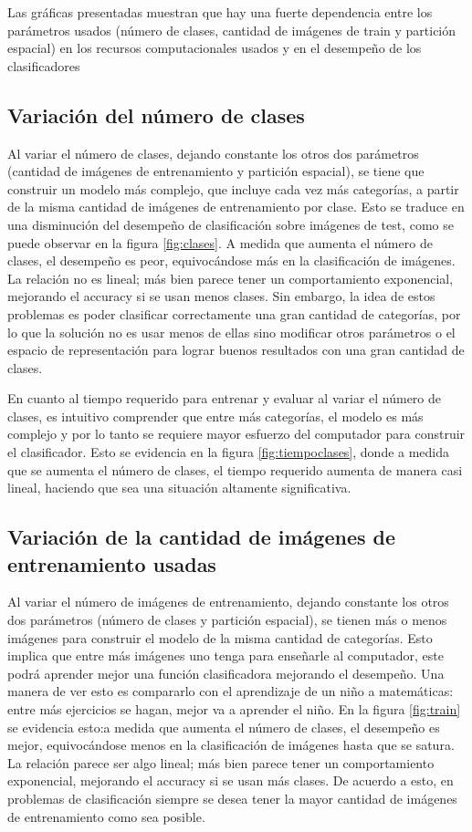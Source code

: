 \documentclass[10pt,twocolumn,letterpaper]{article}
\begin{document}
Las gráficas presentadas muestran que hay una fuerte dependencia entre los parámetros usados (número de clases, cantidad de imágenes de train y partición espacial) en los recursos computacionales usados y en el desempeño de los clasificadores

\subsection{Variación del número de clases}
Al variar el número de clases, dejando constante los otros dos parámetros (cantidad de imágenes de entrenamiento y partición espacial), se tiene que construir un modelo más complejo, que incluye cada vez más categorías, a partir de la misma cantidad de imágenes de entrenamiento por clase. Esto se traduce en una disminución del desempeño de clasificación sobre imágenes de test, como se puede observar en la figura \ref{fig:clases}. A medida que aumenta el número de clases, el desempeño es peor, equivocándose más en la clasificación de imágenes. La relación no es lineal; más bien parece tener un comportamiento exponencial, mejorando el accuracy si se usan menos clases. Sin embargo, la idea de estos problemas es poder clasificar correctamente una gran cantidad de categorías, por lo que la solución no es usar menos de ellas sino modificar otros parámetros o el espacio de representación para lograr buenos resultados con una gran cantidad de clases. 

En cuanto al tiempo requerido para entrenar y evaluar al variar el número de clases, es intuitivo comprender que entre más categorías, el modelo es más complejo y por lo tanto se requiere mayor esfuerzo del computador para construir el clasificador. Esto se evidencia en la figura \ref{fig:tiempoclases}, donde a medida que se aumenta el número de clases, el tiempo requerido aumenta de manera casi lineal, haciendo que sea una situación altamente significativa.

\subsection{Variación de la cantidad de imágenes de entrenamiento usadas}
Al variar el número de imágenes de entrenamiento, dejando constante los otros dos parámetros (número de clases y partición espacial), se tienen más o menos imágenes para construir el modelo de la misma cantidad de categorías. Esto implica que entre más imágenes uno tenga para enseñarle al computador, este podrá aprender mejor una función clasificadora mejorando el desempeño. Una manera de ver esto es compararlo con el aprendizaje de un niño a matemáticas: entre más ejercicios se hagan, mejor va a aprender el niño. En la figura \ref{fig:train} se evidencia esto:a medida que aumenta el número de clases, el desempeño es mejor, equivocándose menos en la clasificación de imágenes hasta que se satura. La relación parece ser algo lineal; más bien parece tener un comportamiento exponencial, mejorando el accuracy si se usan más clases. De acuerdo a esto, en problemas de clasificación siempre se desea tener la mayor cantidad de imágenes de entrenamiento como sea posible.
\end{document}
